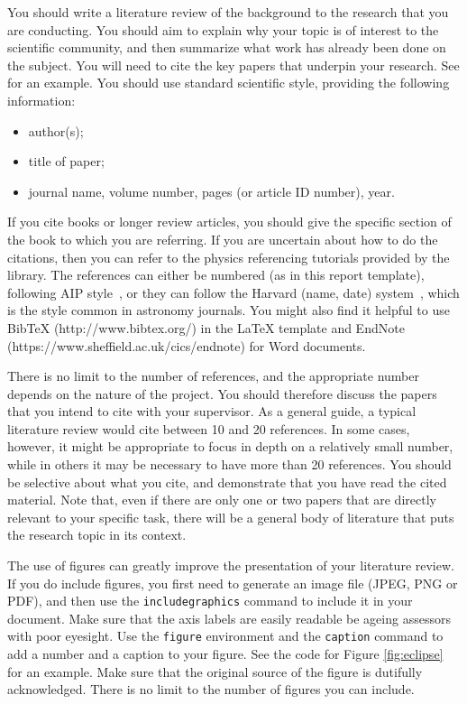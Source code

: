 \documentclass[a4paper,11pt]{article}
\begin{document}
You should write a literature review of the background to the research that you are conducting. You should aim to explain why your topic is of interest to the scientific community, and then summarize what work has already been done on the subject. You will need to cite the key papers that underpin your research. See \cite{Einstein} for an example. You should use standard scientific style, providing the following information: 
\begin{itemize}
\item author(s);
\item title of paper;
\item journal name, volume number, pages (or article ID number), year.
\end{itemize}
If you cite books \cite{good book} or longer review articles, you should give the specific section of the book to which you are referring. 
If you are uncertain about how to do the citations, then you can refer to the physics referencing tutorials provided by the library.
The references can either be numbered (as in this report template), following AIP style~\cite{AIP style}, or they can follow the Harvard (name, date) system~\cite{Harvard style}, which is the  style common in astronomy journals. 
You might also find it helpful to use BibTeX (http://www.bibtex.org/) in the LaTeX template and EndNote (https://www.sheffield.ac.uk/cics/endnote) for Word documents.


There is no limit to the number of references, and the appropriate number depends on the nature of the project.  You should therefore discuss the papers that you intend to cite with your supervisor.  As a general guide, a typical literature review would cite between 10 and 20 references. In some cases, however, it might be appropriate to focus in depth on a relatively small number, while in others it may be necessary to have more than 20 references. You should be selective about what you cite, and demonstrate that you have read the cited material. 
 Note that, even if there are only one or two papers that are directly relevant to your specific task, there will be a general body of literature that puts the research topic in its context.
 
The use of figures can greatly improve the presentation of your literature review. If you do include figures, you first need to generate an image file (JPEG, PNG or PDF), and then use the {\tt includegraphics} command to include it in your document. Make sure that the axis labels are easily readable be ageing assessors with poor eyesight. Use the {\tt figure} environment and the {\tt caption} command to add a number and a caption to your figure. See the code for Figure \ref{fig:eclipse} for an example. Make sure that the original source of the figure is dutifully acknowledged. There is no limit to the number of figures you can include.
\end{document}
